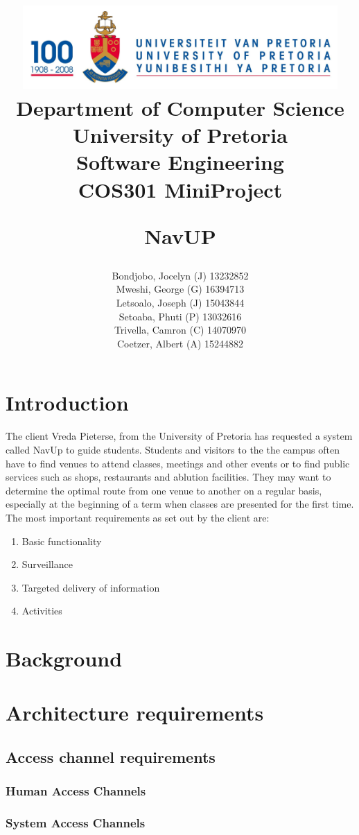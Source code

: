 \documentclass[a4paper,10pt]{article}
\title{\includegraphics[width=12cm]{Eeufeeslogo.jpg} \\
       Department of Computer Science \\
       University of Pretoria \\
       \vspace{0.5cm}
       Software Engineering\\
       COS301 MiniProject \\
       \vspace{0.5cm}
       \begin{large}NavUP\end{large}
}
\date{}
\author{Bondjobo, Jocelyn (J) 13232852 			\\
		Mweshi, George (G)		16394713		\\
		Letsoalo, Joseph (J)	15043844		\\
		Setoaba, Phuti (P)		13032616		\\
		Trivella, Camron (C)	14070970		\\
		Coetzer, Albert (A)		15244882		\\
}
\begin{document}
\maketitle
\thispagestyle{empty}
\clearpage

\newpage
{}
\thispagestyle{empty}
\tableofcontents
\clearpage

\newpage
{}

\section{Introduction}
The client Vreda Pieterse, from the University of Pretoria has requested a system called NavUp to guide students. Students and visitors to the the campus often have to find venues to attend classes, meetings and other events or to find public services such as shops, restaurants and ablution facilities. They may want to determine the optimal route from one venue to another on a regular basis, especially at the beginning of a term when classes are presented for the first time.
The most important requirements as set out by the client are:
\begin{enumerate}
\item Basic functionality
\item Surveillance
\item Targeted delivery of information
\item Activities
\end{enumerate}

\section{Background}

\section{Architecture requirements}
\subsection{Access channel requirements}
\subsubsection{Human Access Channels}

\subsubsection{System Access Channels}
\end{document}
